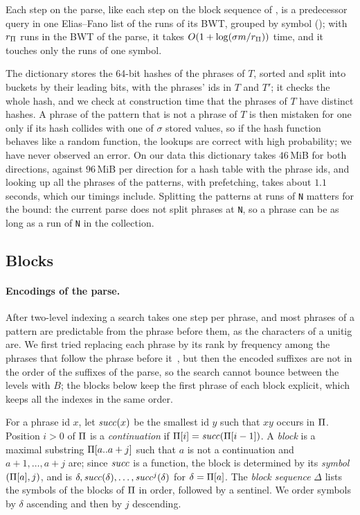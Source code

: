 Each step on the parse, like each step on the block sequence of
, is a predecessor query in one Elias--Fano list of
the runs of its BWT, grouped by symbol (); with
$r_\Pi$ runs in the BWT of the parse, it takes $O(1 + \log(\sigma m /
r_\Pi))$ time, and it touches only the runs of one symbol.

The dictionary stores the 64-bit hashes of the phrases of $T$, sorted
and split into buckets by their leading bits, with the phrases' ids in
$T$ and $T'$; it checks the whole hash, and we check at construction
time that the phrases of $T$ have distinct hashes. A phrase of the
pattern that is not a phrase of $T$ is then mistaken for one only if
its hash collides with one of $\sigma$ stored values, so if the hash
function behaves like a random function, the lookups are correct with
high probability; we have never observed an error. On our data
this dictionary takes $46$\,MiB for both directions, against
$96$\,MiB per direction for a hash table with the phrase ids, and
looking up all the phrases of the patterns, with prefetching, takes
about $1.1$ seconds, which our timings include. Splitting the patterns at runs of \texttt{N}
matters for the bound: the current parse does not split phrases at
\texttt{N}, so a phrase can be as long as a run of \texttt{N} in the
collection.

\subsection{Blocks}
\label{sec:blocks}

\paragraph*{Encodings of the parse.}
\label{sec:encodings}
After two-level indexing a search takes one step per phrase, and most
phrases of a pattern are predictable from the phrase before them, as
the characters of a unitig are. We first tried replacing each phrase by
its rank by frequency among the phrases that follow the phrase before
it~\cite{GagieHybrid2026}, but then the encoded suffixes are not in the
order of the suffixes of the parse, so the search cannot bounce between
the levels with $B$; the blocks below keep the first phrase of each
block explicit, which keeps all the indexes in the same order.

For a phrase id $x$, let $\mathit{succ}(x)$ be the smallest id $y$ such that
$x y$ occurs in $\Pi$. Position $i > 0$ of $\Pi$ is a
\emph{continuation} if $\Pi[i] = \mathit{succ}(\Pi[i-1])$. A \emph{block} is a
maximal substring $\Pi[a .. a + j]$ such that $a$ is not a continuation
and $a + 1, \ldots, a + j$ are; since $\mathit{succ}$ is a function, the block
is determined by its \emph{symbol} $(\Pi[a], j)$, and is $\delta, \mathit{succ}(\delta),
\ldots, \mathit{succ}^j(\delta)$ for $\delta = \Pi[a]$. The \emph{block sequence}
$\Delta$ lists the symbols of the blocks of $\Pi$ in order, followed by
a sentinel. We order symbols by $\delta$ ascending and then by $j$
descending.

